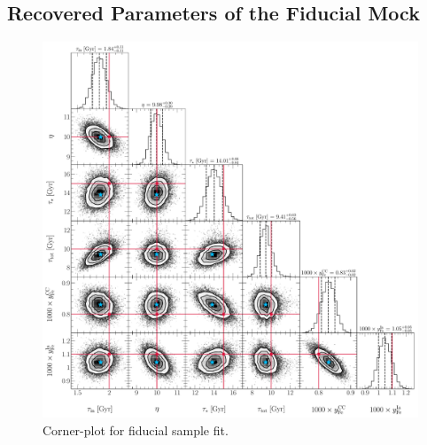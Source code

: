 \documentclass[ms.tex]{subfiles}
\begin{document}
\subsection{Recovered Parameters of the Fiducial Mock}
\label{sec:mocks:fiducial_fit}

\begin{figure}
\centering
\includegraphics[scale = 0.45]{fiducial_76k8.pdf}
\caption{Corner-plot for fiducial sample fit.}
\label{fig:corner_fiducial}
\end{figure}
\end{document}
